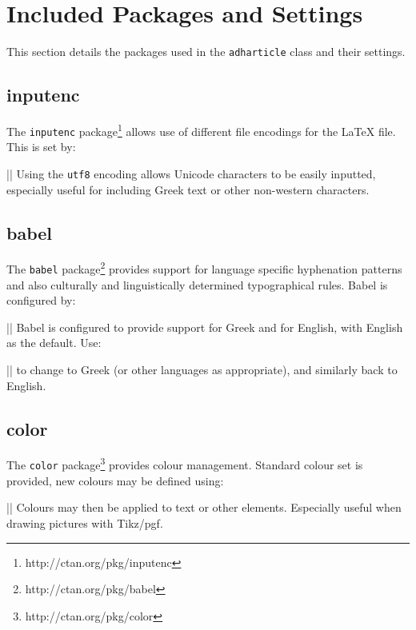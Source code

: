 \documentclass{adharticle} %
\begin{document}

\section{Included Packages and Settings}


This section details the packages used in the \texttt{adharticle} class and
their settings.

\subsection{inputenc}

The \texttt{inputenc} package\footnote{http://ctan.org/pkg/inputenc} allows use
of different file encodings for the LaTeX file. This is set by:

\latex|\RequirePackage[utf8]{inputenc}|
Using the \texttt{utf8} encoding allows Unicode characters to be easily
inputted, especially useful for including Greek text or other non-western
characters.

\subsection{babel}

The \texttt{babel} package\footnote{http://ctan.org/pkg/babel} provides support
for language specific hyphenation patterns and also culturally and
linguistically determined typographical rules. Babel is configured by:

\latex||
Babel is configured to provide support for Greek and for English, with English
as the default. Use:

\latex||
to change to Greek (or other languages as appropriate), and similarly back to
English.

\subsection{color}

The \texttt{color} package\footnote{http://ctan.org/pkg/color} provides colour
management. Standard colour set is provided, new colours may be defined using:

\latex||
Colours may then be applied to text or other elements. Especially useful when
drawing pictures with Tikz/pgf.
\end{document}
